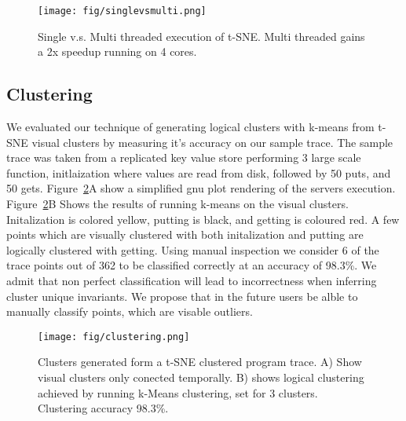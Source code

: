 \begin{figure}[t]
\centering
    \texttt{[image: fig/singlevsmulti.png]}

    \caption{
        Single v.s. Multi threaded execution of t-SNE. Multi threaded gains a 2x speedup running on 4 cores.
    }

    \label{fig:singlevsmulti}
\end{figure}

\subsection{Clustering}

We evaluated our technique of generating logical clusters with k-means
from t-SNE visual clusters by measuring it's accuracy on our sample
trace. The sample trace was taken from a replicated key value store
performing 3 large scale function, initlaization where values are read
from disk, followed by 50 puts, and 50 gets.
Figure~\ref{fig:clustering}A show a simplified gnu plot rendering of
the servers execution. Figure~\ref{fig:clustering}B Shows the results
of running k-means on the visual clusters. Initalization is colored
yellow, putting is black, and getting is coloured red. A few points
which are visually clustered with both initalization and putting are
logically clustered with getting. Using manual inspection we consider
6 of the trace points out of 362 to be classified correctly at an
accuracy of 98.3\%. We admit that non perfect classification will lead
to incorrectness when inferring cluster unique invariants. We propose
that in the future users be alble to manually classify points, which
are visable outliers.


\begin{figure}[t]
\centering
    \texttt{[image: fig/clustering.png]}

    \caption{
        Clusters generated form a t-SNE clustered program trace. A) Show visual clusters only conected temporally. B) shows logical clustering achieved by running k-Means clustering, set for 3 clusters. Clustering accuracy 98.3\%.
    }

    \label{fig:clustering}
\end{figure}
